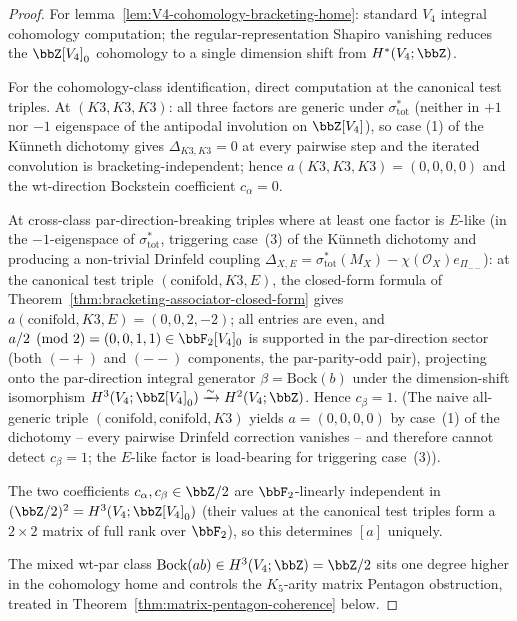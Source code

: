 \begin{proof}
For lemma~\ref{lem:V4-cohomology-bracketing-home}: standard $V_4$ integral
cohomology computation; the regular-representation Shapiro vanishing reduces
the $\bbZ[V_4]_0$ cohomology to a single dimension shift from
$H^*(V_4; \bbZ)$.

For the cohomology-class identification, direct computation at the
canonical test triples. At $(K3, K3, K3)$: all three factors are
generic under $\sigma_{\mathrm{tot}}^*$ \textup{(}neither in $+1$ nor
$-1$ eigenspace of the antipodal involution on $\bbZ[V_4]$\textup{)}, so
case (1) of the K\"unneth dichotomy gives $\Delta_{K3, K3} = 0$ at every
pairwise step and the iterated convolution is bracketing-independent;
hence $a(K3, K3, K3) = (0, 0, 0, 0)$ and the wt-direction Bockstein
coefficient $c_{\alpha} = 0$.

At cross-class par-direction-breaking triples where at least one
factor is $E$-like \textup{(}in the $-1$-eigenspace of
$\sigma_{\mathrm{tot}}^*$, triggering case~(3) of the K\"unneth
dichotomy and producing a non-trivial Drinfeld coupling $\Delta_{X, E}
= \sigma_{\mathrm{tot}}^*(M_X) - \chi(\mathcal{O}_X) e_{\Pi_{--}}$\textup{):}
at the canonical test triple $(\mathrm{conifold}, K3, E)$, the closed-form
formula of Theorem~\ref{thm:bracketing-associator-closed-form} gives
$a(\mathrm{conifold}, K3, E) = (0, 0, 2, -2)$; all entries are even,
and $a/2 \pmod 2 = (0, 0, 1, 1) \in \bbF_2[V_4]_0$ is supported in the
par-direction sector \textup{(}both $(-+)$ and $(--)$ components, the
par-parity-odd pair\textup{),} projecting onto the par-direction
integral generator $\beta = \mathrm{Bock}(b)$ under the dimension-shift
isomorphism $H^3(V_4; \bbZ[V_4]_0) \xrightarrow{\sim} H^2(V_4; \bbZ)$.
Hence $c_{\beta} = 1$. \textup{(}The naive all-generic triple
$(\mathrm{conifold}, \mathrm{conifold}, K3)$ yields $a = (0, 0, 0, 0)$
by case~(1) of the dichotomy -- every pairwise Drinfeld correction
vanishes -- and therefore cannot detect $c_{\beta} = 1$; the
$E$-like factor is load-bearing for triggering case~(3)\textup{).}

The two coefficients $c_{\alpha}, c_{\beta} \in \bbZ/2$ are
$\bbF_2$-linearly independent in $(\bbZ/2)^2 = H^3(V_4; \bbZ[V_4]_0)$
\textup{(}their values at the canonical test triples form a
$2 \times 2$ matrix of full rank over $\bbF_2$\textup{)}, so this
determines $[a]$ uniquely.

The mixed wt-par class $\mathrm{Bock}(ab) \in H^3(V_4; \bbZ) = \bbZ/2$
sits one degree higher in the cohomology home and controls the $K_5$-arity
matrix Pentagon obstruction, treated in
Theorem~\ref{thm:matrix-pentagon-coherence} below.
\end{proof}


